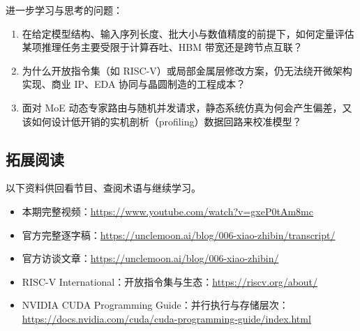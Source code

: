 \documentclass[UTF8,a4paper,11pt,fontset=fandol]{ctexart}
\begin{document}
进一步学习与思考的问题：
\begin{enumerate}
\item 在给定模型结构、输入序列长度、批大小与数值精度的前提下，如何定量评估某项推理任务主要受限于计算吞吐、HBM 带宽还是跨节点互联？
\item 为什么开放指令集（如 RISC-V）或局部金属层修改方案，仍无法绕开微架构实现、商业 IP、EDA 协同与晶圆制造的工程成本？
\item 面对 MoE 动态专家路由与随机并发请求，静态系统仿真为何会产生偏差，又该如何设计低开销的实机剖析（profiling）数据回路来校准模型？
\end{enumerate}
\subsection{拓展阅读}
以下资料供回看节目、查阅术语与继续学习。
\begin{itemize}
\item 本期完整视频：\url{https://www.youtube.com/watch?v=gxeP0tAm8mc}
\item 官方完整逐字稿：\url{https://unclemoon.ai/blog/006-xiao-zhibin/transcript/}
\item 官方访谈文章：\url{https://unclemoon.ai/blog/006-xiao-zhibin/}
\item RISC-V International：开放指令集与生态：\url{https://riscv.org/about/}
\item NVIDIA CUDA Programming Guide：并行执行与存储层次：\url{https://docs.nvidia.com/cuda/cuda-programming-guide/index.html}
\end{itemize}
\end{document}
